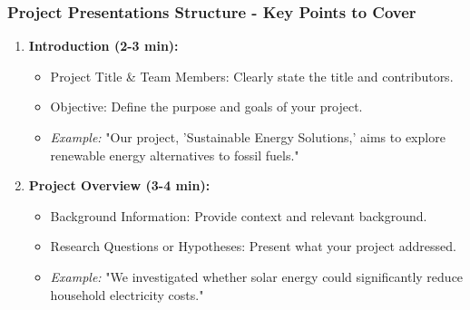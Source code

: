 \documentclass[aspectratio=169]{beamer}
\begin{document}
\begin{frame}[fragile]
    \frametitle{Project Presentations Structure - Key Points to Cover}
    \begin{enumerate}
        \item \textbf{Introduction (2-3 min):}
            \begin{itemize}
                \item Project Title \& Team Members: Clearly state the title and contributors.
                \item Objective: Define the purpose and goals of your project.
                
                \item \textit{Example:} "Our project, 'Sustainable Energy Solutions,' aims to explore renewable energy alternatives to fossil fuels."
            \end{itemize}

        \item \textbf{Project Overview (3-4 min):}
            \begin{itemize}
                \item Background Information: Provide context and relevant background.
                \item Research Questions or Hypotheses: Present what your project addressed.
                
                \item \textit{Example:} "We investigated whether solar energy could significantly reduce household electricity costs."
            \end{itemize}
    \end{enumerate}
\end{frame}
\end{document}
